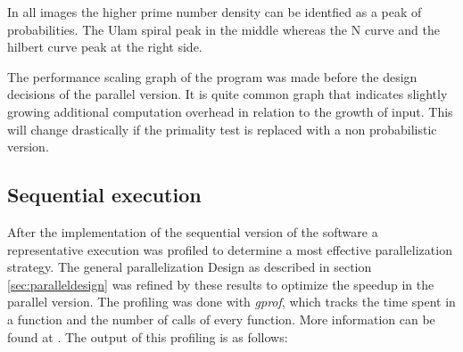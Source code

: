 In all images the higher prime number density can be identfied as a peak of probabilities. The Ulam spiral peak in the middle whereas the N curve and the hilbert curve peak at the right side.

The performance scaling graph of the program was made before the design decisions of the parallel version. It is quite common graph that indicates slightly growing additional computation overhead in relation to the growth of input. This will change drastically if the primality test is replaced with a non probabilistic version.

\subsection{Sequential execution}
\label{sec:seq_ex}
After the implementation of the sequential version of the software a representative execution was profiled to determine a most effective parallelization strategy. The general parallelization Design as described in section \ref{sec:paralleldesign} was refined by these results to optimize the speedup in the parallel version.
The profiling was done with \emph{gprof}, which tracks the time spent in a function and the number of calls of every function. More information can be found at \cite{gprof}.
The output of this profiling is as follows:

